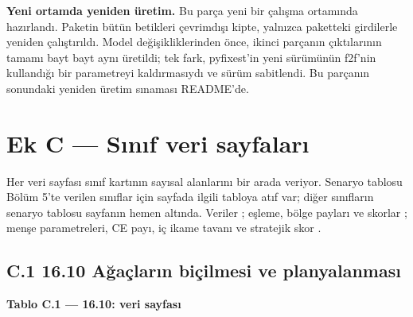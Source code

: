 \textbf{Yeni ortamda yeniden üretim.} Bu parça yeni bir çalışma ortamında hazırlandı. Paketin bütün betikleri çevrimdışı kipte, yalnızca paketteki girdilerle yeniden çalıştırıldı. Model değişikliklerinden önce, ikinci parçanın çıktılarının tamamı bayt bayt aynı üretildi; tek fark, pyfixest'in yeni sürümünün f2f'nin kullandığı bir parametreyi kaldırmasıydı ve sürüm sabitlendi. Bu parçanın sonundaki yeniden üretim sınaması README'de.

\hypertarget{nace_kartlar_16-18-ek-c--sux131nux131f-veri-sayfalarux131}{%
\section{Ek C --- Sınıf veri sayfaları}\label{nace_kartlar_16-18-ek-c--sux131nux131f-veri-sayfalarux131}}

Her veri sayfası sınıf kartının sayısal alanlarını bir arada veriyor. Senaryo tablosu Bölüm 5'te verilen sınıflar için sayfada ilgili tabloya atıf var; diğer sınıfların senaryo tablosu sayfanın hemen altında. Veriler \etiketV{}; eşleme, bölge payları ve skorlar \etiketT{}; menşe parametreleri, CE payı, iç ikame tavanı ve stratejik skor \etiketH{}.

\hypertarget{nace_kartlar_16-18-c1-1610-aux11fauxe7larux131n-biuxe7ilmesi-ve-planyalanmasux131}{%
\subsection{C.1 16.10 Ağaçların biçilmesi ve planyalanması}\label{nace_kartlar_16-18-c1-1610-aux11fauxe7larux131n-biuxe7ilmesi-ve-planyalanmasux131}}


\textbf{Tablo C.1 --- 16.10: veri sayfası}

\nopagebreak[4]

\begingroup\gbtablo\small


